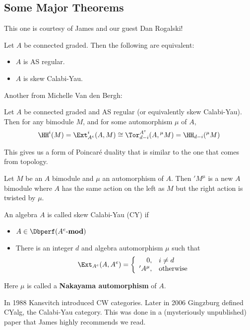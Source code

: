 \documentclass[12pt]{article}
\begin{document}
\subsection{Some Major Theorems}
This one is courtesy of James and our guest Dan Rogalski!
\begin{thm}[RRZ]
	Let $A$ be connected graded. Then the following are equivalent:
	\begin{itemize}
		\item $A$ is AS regular.
		\item $A$ is skew Calabi-Yau.
	\end{itemize}
\end{thm}
Another from Michelle Van den Bergh:
\begin{thm}\label{thm-VdB}
	Let $A$ be connected graded and AS regular (or equivalently skew Calabi-Yau). Then for any bimodule $M$,
	and for some automorphism $\mu$ of $A$,
	\[\HH^i(M)=\Ext^i_{A^e}(A,M)\cong \Tor_{d-i}^{A^{e}}(A,{^\mu}M)=\HH_{d-i}({^\mu}M)\]
\end{thm}
\begin{rmk}
	This gives us a form of Poincar\'e duality that is similar to the one that comes from topology.
\end{rmk}
\begin{defn}
	Let $M$ be an $A$ bimodule and $\mu$ an automorphism of $A$. Then $'M^\mu$ is a new $A$ bimodule where $A$ 
	has the same action on the left as $M$ but the right action is twisted by $\mu$.
\end{defn}
\begin{defn}
	An algebra $A$ is called skew Calabi-Yau (CY) if 
	\begin{itemize}
		\item $A\in\Dbperf(A^{e}\text{-}\mathbf{mod})$
		\item There is an integer $d$ and algebra automorphism $\mu$ such that 
	\[\Ext_{A^{e}}(A,A^e)=\left\{\begin{array}{rl}
	0, & i\ne d\\ 'A^\mu, & \text{otherwise}\end{array}\right.\]
	\end{itemize}
	Here $\mu$ is called a \textbf{Nakayama automorphism} of $A$.
\end{defn}
\begin{rmk}
	In 1988 Kansvitch introduced CW categories. Later in 2006 Gingzburg defined CYalg, the Calabi-Yau category. This 
	was done in a (mysteriously unpublished) paper that James highly recommends we read.
\end{rmk}
\end{document}
